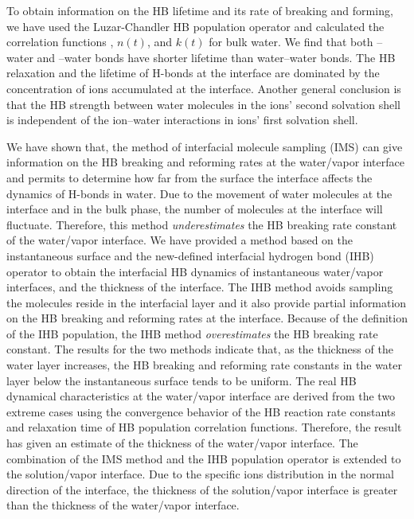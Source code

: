 To obtain information on the HB lifetime and its rate of breaking and forming, we have used the Luzar-Chandler HB population operator and calculated the correlation functions \CHB, $n(t)$, and $k(t)$ for bulk water. 
We find that both \nitrate--water and \I--water bonds have shorter lifetime than water--water bonds.
The HB relaxation and the lifetime of H-bonds
at the interface are dominated by the concentration of ions accumulated at the interface. 
Another general conclusion is that the HB strength between water molecules in the ions' second solvation shell is independent 
of the ion--water interactions in ions' first solvation shell.

We have shown that,
the method of interfacial molecule sampling (IMS) can give information on the HB breaking and reforming
rates at the water/vapor interface and permits to determine how far from the surface the interface affects the dynamics of H-bonds in water. 
Due to the movement of water molecules at the interface and in the bulk phase, the number of molecules at the interface will fluctuate.
Therefore, this method \emph{underestimates} the HB breaking rate constant of the water/vapor interface. 
We have provided a method based on the {instantaneous} surface and the new-defined
interfacial hydrogen bond (IHB) operator to obtain the interfacial HB dynamics of instantaneous water/vapor interfaces, and the thickness of the interface.  
The IHB method avoids sampling the molecules reside in the interfacial layer and
it also provide partial information on the HB breaking and reforming rates at the interface. 
Because of the definition of the IHB population, the IHB method \emph{overestimates} the HB breaking rate constant. 
The results for the two methods indicate that,
as the thickness of the water layer increases,
the HB breaking and reforming rate constants in the water layer {below} the instantaneous surface tends to be uniform. 
The real HB dynamical characteristics at the water/vapor interface 
are derived from the two extreme cases using the convergence behavior of the HB reaction rate constants and relaxation time 
of HB population correlation functions. 
Therefore, the result has given an estimate of the thickness of the water/vapor interface.  
The combination of the IMS method and the IHB population operator is extended to the solution/vapor interface. 
Due to the specific ions distribution in the normal direction of the interface,
the thickness of the solution/vapor interface is greater than the thickness of the water/vapor interface. 


